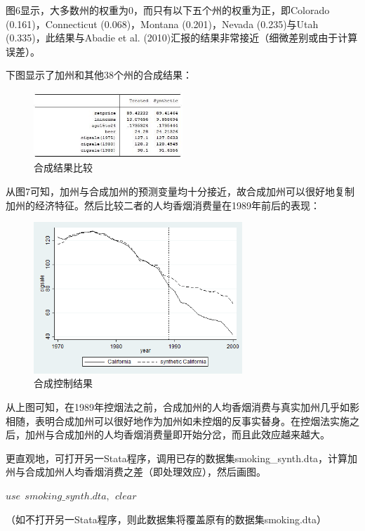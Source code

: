 \documentclass[cn,12pt,math=newtx,citestyle=gb7714-2015,bibstyle=gb7714-2015]{elegantbook}
\begin{document}
	图6显示，大多数州的权重为0，而只有以下五个州的权重为正，即Colorado (0.161)，Connecticut (0.068)，Montana (0.201)，Nevada (0.235)与Utah (0.335)，此结果与Abadie et al. (2010)汇报的结果非常接近（细微差别或由于计算误差）。
	
	下图显示了加州和其他38个州的合成结果：
	
	\begin{figure}[htbp]
		\centering
		\includegraphics[width=0.5\textwidth]{sys.jpg}
		\caption{合成结果比较}\label{fig:digit}
	\end{figure}
	
	从图7可知，加州与合成加州的预测变量均十分接近，故合成加州可以很好地复制加州的经济特征。然后比较二者的人均香烟消费量在1989年前后的表现：
	
	\begin{figure}[htbp]
		\centering
		\includegraphics[width=0.7\textwidth]{synth.png}
		\caption{合成控制结果}\label{fig:digit}
	\end{figure}
	
	从上图可知，在1989年控烟法之前，合成加州的人均香烟消费与真实加州几乎如影相随，表明合成加州可以很好地作为加州如未控烟的反事实替身。在控烟法实施之后，加州与合成加州的人均香烟消费量即开始分岔，而且此效应越来越大。
	
	更直观地，可打开另一Stata程序，调用已存的数据集smoking\_synth.dta，计算加州与合成加州人均香烟消费之差（即处理效应），然后画图。
	
	\textbf{$use~~smoking\_synth.dta,~~clear$}
	
	（如不打开另一Stata程序，则此数据集将覆盖原有的数据集smoking.dta）
	
\end{document}
